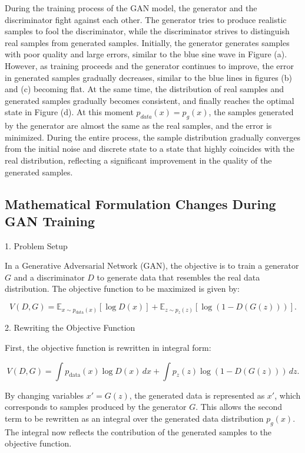 During the training process of the GAN model, the generator and the discriminator fight against each other. 
The generator tries to produce realistic samples to fool the discriminator, while the discriminator strives 
to distinguish real samples from generated samples. Initially, the generator generates samples with poor 
quality and large errors, similar to the blue sine wave in Figure (a). However, as training proceeds and 
the generator continues to improve, the error in generated samples gradually decreases, similar to the 
blue lines in figures (b) and (c) becoming flat. At the same time, the distribution of real samples and 
generated samples gradually becomes consistent, and finally reaches the optimal state in Figure (d). At this moment $p_{data}(x) = p_g(x)$, 
the samples generated by the generator are almost the same as the real samples, and the error is minimized. 
During the entire process, the sample distribution gradually converges from the initial noise and discrete 
state to a state that highly coincides with the real distribution, reflecting a significant improvement in 
the quality of the generated samples.


\subsection{Mathematical Formulation Changes During GAN Training}


1. Problem Setup

In a Generative Adversarial Network (GAN), the objective is to train a generator \( G \) and a discriminator \( D \) 
to generate data that resembles the real data distribution. The objective function to be maximized is given by:

\begin{equation}
    V(D, G) = \mathbb{E}_{x \sim p_{\text{data}}(x)} [\log D(x)] + \mathbb{E}_{z \sim p_{z}(z)} [\log (1 - D(G(z)))].
\end{equation}

2. Rewriting the Objective Function

First, the objective function is rewritten in integral form:

\begin{equation}
    V(D, G) = \int p_{\text{data}}(x) \log D(x) \, dx + \int p_{z}(z) \log (1 - D(G(z))) \, dz.
\end{equation}

By changing variables $x' = G(z)$, the generated data is represented as $x'$, which corresponds to samples produced by the generator $G$. This allows the second term to be rewritten as an integral over the generated data distribution $p_g(x)$. The integral now reflects the contribution of the generated samples to the objective function.

